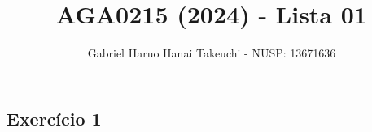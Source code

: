 \documentclass{article}
\title{AGA0215 (2024) - Lista 01}
\author{Gabriel Haruo Hanai Takeuchi - NUSP: 13671636}
\begin{document}
\maketitle

\subsection*{Exercício 1}
\end{document}
